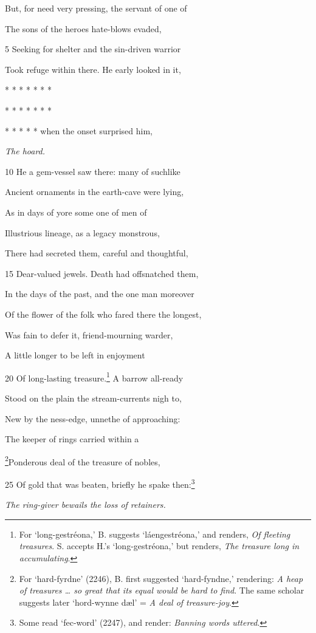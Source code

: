 But, for need very pressing, the servant of one of

The sons of the heroes hate-blows evaded,

5
Seeking for shelter and the sin-driven warrior

Took refuge within there. He early looked in it,

*
*
*
*
*
* *

*
*
*
*
*
* *

* * * * * when the onset surprised him,

\emph{The hoard.}

10
He a gem-vessel saw there: many of suchlike

Ancient ornaments in the earth-cave were lying,

As in days of yore some one of men of

Illustrious lineage, as a legacy monstrous,

There had secreted them, careful and thoughtful,

15
Dear-valued jewels. Death had offsnatched them,

In the days of the past, and the one man moreover

Of the flower of the folk who fared there the longest,

Was fain to defer it, friend-mourning warder,

A little longer to be left in enjoyment

20
Of long-lasting treasure.\footnote{For ‘long-gestréona,’ B. suggests ‘láengestréona,’ and renders, \emph{Of fleeting
treasures}. S. accepts H.’s ‘long-gestréona,’ but renders, \emph{The treasure long
in accumulating}.} A barrow all-ready

Stood on the plain the stream-currents nigh to,

New by the ness-edge, unnethe of approaching:

The keeper of rings carried within a

\footnote{For ‘hard-fyrdne’ (2246), B. first suggested ‘hard-fyndne,’ rendering:
\emph{A heap of treasures … so great that its equal would be hard to find}. The same
scholar suggests later ‘hord-wynne dæl’ = \emph{A deal of treasure-joy}.}Ponderous deal of the treasure of nobles,

25
Of gold that was beaten, briefly he spake then:\footnote{Some read ‘fec-word’ (2247), and render: \emph{Banning words uttered}.}

\emph{The ring-giver bewails
the loss of
retainers.}

